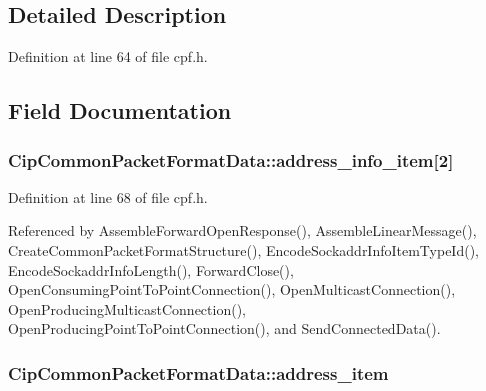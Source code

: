 \subsection{\-Detailed \-Description}


\-Definition at line 64 of file cpf.\-h.



\subsection{\-Field \-Documentation}
\hypertarget{structCipCommonPacketFormatData_afc2883222efe7445cb7836d5da872f54}{
\subsubsection[{address\-\_\-info\-\_\-item}]{ {\bf \-Cip\-Common\-Packet\-Format\-Data\-::address\-\_\-info\-\_\-item}\mbox{[}2\mbox{]}}}\label{db/d80/structCipCommonPacketFormatData_afc2883222efe7445cb7836d5da872f54}


\-Definition at line 68 of file cpf.\-h.



\-Referenced by \-Assemble\-Forward\-Open\-Response(), \-Assemble\-Linear\-Message(), \-Create\-Common\-Packet\-Format\-Structure(), \-Encode\-Sockaddr\-Info\-Item\-Type\-Id(), \-Encode\-Sockaddr\-Info\-Length(), \-Forward\-Close(), \-Open\-Consuming\-Point\-To\-Point\-Connection(), \-Open\-Multicast\-Connection(), \-Open\-Producing\-Multicast\-Connection(), \-Open\-Producing\-Point\-To\-Point\-Connection(), and \-Send\-Connected\-Data().

\hypertarget{structCipCommonPacketFormatData_a6f7f7299bfdc600609c9b9f8fc55ac5b}{
\subsubsection[{address\-\_\-item}]{ {\bf \-Cip\-Common\-Packet\-Format\-Data\-::address\-\_\-item}}}\label{db/d80/structCipCommonPacketFormatData_a6f7f7299bfdc600609c9b9f8fc55ac5b}



